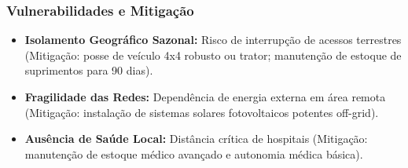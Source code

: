 \subsubsection{Vulnerabilidades e
Mitigação}

\begin{itemize}
\tightlist
\item
  \textbf{Isolamento Geográfico Sazonal:} Risco de interrupção de
  acessos terrestres (Mitigação: posse de veículo 4x4 robusto ou trator;
  manutenção de estoque de suprimentos para 90 dias).
\item
  \textbf{Fragilidade das Redes:} Dependência de energia externa em área
  remota (Mitigação: instalação de sistemas solares fotovoltaicos
  potentes off-grid).
\item
  \textbf{Ausência de Saúde Local:} Distância crítica de hospitais
  (Mitigação: manutenção de estoque médico avançado e autonomia médica
  básica).
\end{itemize}

